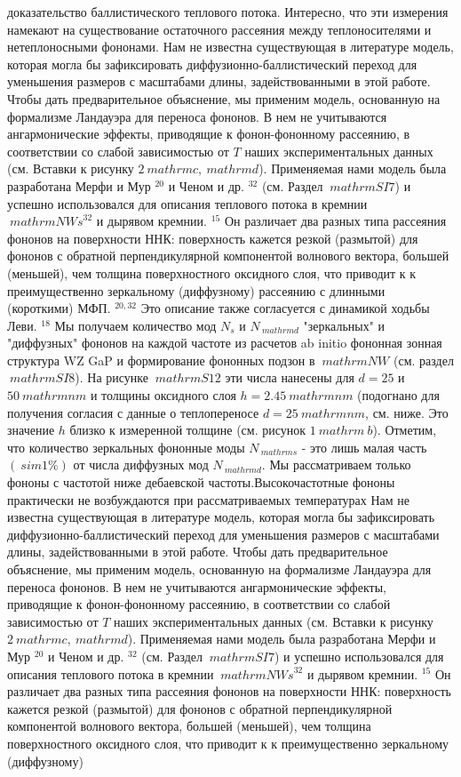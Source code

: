 \documentclass[a4paper, 12pt]{article}%
\begin{document}
доказательство баллистического теплового потока. Интересно, что эти измерения намекают на существование остаточного рассеяния между теплоносителями и нетеплоносными фононами. 
Нам не известна существующая в литературе модель, которая могла бы зафиксировать диффузионно-баллистический переход для уменьшения размеров с масштабами длины, задействованными в этой работе. Чтобы дать предварительное объяснение, мы применим модель, основанную на формализме Ландауэра для переноса фононов. В нем не учитываются ангармонические эффекты, приводящие к фонон-фононному рассеянию, в соответствии со слабой зависимостью от $ T $ наших экспериментальных данных (см. Вставки к рисунку $ 2 \ mathrm {c}, \ mathrm {d} $). Применяемая нами модель была разработана Мерфи и Мур $ ^ {20} $ и Ченом и др. $ {} ^ {32} $ (см. Раздел $ \ mathrm {SI} 7 $) и успешно использовался для описания теплового потока в кремнии $ \ mathrm {NWs} ^ {32} $ и дырявом кремнии. $ {} ^ {15} $ Он различает два разных типа рассеяния фононов на поверхности ННК: поверхность кажется резкой (размытой) для фононов с обратной перпендикулярной компонентой волнового вектора, большей (меньшей), чем толщина поверхностного оксидного слоя, что приводит к к преимущественно зеркальному (диффузному) рассеянию с длинными (короткими) МФП. $ {} ^ {20,32} $ Это описание также согласуется с динамикой ходьбы Леви. $ {} ^ {18} $ Мы получаем количество мод $ N_ {s} $ и $ N _ {\ mathrm {d}} $ "зеркальных" и "диффузных" фононов на каждой частоте из расчетов ab initio фононная зонная структура WZ GaP и формирование фононных подзон в $ \ mathrm {NW} $ (см. раздел $ \ mathrm {SI} 8 $). На рисунке $ \ mathrm {S} 12 $ эти числа нанесены для $ d = 25 $ и $ 50 \ mathrm {nm} $ и толщины оксидного слоя $ h = 2.45 \ mathrm {nm} $ (подогнано для получения согласия с данные о теплопереносе $ d = 25 \ mathrm {nm} $, см. ниже. Это значение $ h $ близко к измеренной толщине (см. рисунок $ 1 \ mathrm {~ b} $). Отметим, что количество зеркальных фононные моды $ N _ {\ mathrm {s}} $ - это лишь малая часть $ (\ sim 1 \%) $ от числа диффузных мод $ N _ {\ mathrm {d}} $. Мы рассматриваем только фононы с частотой ниже дебаевской частоты.Высокочастотные фононы практически не возбуждаются при рассматриваемых температурах Нам не известна существующая в литературе модель, которая могла бы зафиксировать диффузионно-баллистический переход для уменьшения размеров с масштабами длины, задействованными в этой работе. Чтобы дать предварительное объяснение, мы применим модель, основанную на формализме Ландауэра для переноса фононов. В нем не учитываются ангармонические эффекты, приводящие к фонон-фононному рассеянию, в соответствии со слабой зависимостью от $ T $ наших экспериментальных данных (см. Вставки к рисунку $ 2 \ mathrm {c}, \ mathrm {d} $). Применяемая нами модель была разработана Мерфи и Мур $ ^ {20} $ и Ченом и др. $ {} ^ {32} $ (см. Раздел $ \ mathrm {SI} 7 $) и успешно использовался для описания теплового потока в кремнии $ \ mathrm {NWs} ^ {32} $ и дырявом кремнии. $ {} ^ {15} $ Он различает два разных типа рассеяния фононов на поверхности ННК: поверхность кажется резкой (размытой) для фононов с обратной перпендикулярной компонентой волнового вектора, большей (меньшей), чем толщина поверхностного оксидного слоя, что приводит к к преимущественно зеркальному (диффузному) 
\end{document}
